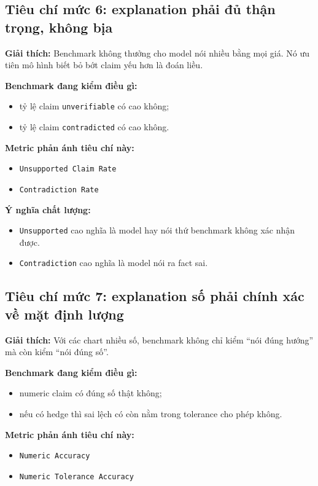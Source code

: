\documentclass[11pt,a4paper]{article}
\newcommand{\field}[1]{\texttt{#1}}
\begin{document}
\subsection{Tiêu chí mức 6: explanation phải đủ thận trọng, không bịa}
\textbf{Giải thích:}
Benchmark không thưởng cho model nói nhiều bằng mọi giá.
Nó ưu tiên mô hình biết bỏ bớt claim yếu hơn là đoán liều.

\textbf{Benchmark đang kiểm điều gì:}
\begin{itemize}
  \item tỷ lệ claim \field{unverifiable} có cao không;
  \item tỷ lệ claim \field{contradicted} có cao không.
\end{itemize}

\textbf{Metric phản ánh tiêu chí này:}
\begin{itemize}
  \item \field{Unsupported Claim Rate}
  \item \field{Contradiction Rate}
\end{itemize}

\textbf{Ý nghĩa chất lượng:}
\begin{itemize}
  \item \field{Unsupported} cao nghĩa là model hay nói thứ benchmark không xác nhận được.
  \item \field{Contradiction} cao nghĩa là model nói ra fact sai.
\end{itemize}

\subsection{Tiêu chí mức 7: explanation số phải chính xác về mặt định lượng}
\textbf{Giải thích:}
Với các chart nhiều số, benchmark không chỉ kiểm ``nói đúng hướng'' mà còn kiểm ``nói đúng số''.

\textbf{Benchmark đang kiểm điều gì:}
\begin{itemize}
  \item numeric claim có đúng số thật không;
  \item nếu có hedge thì sai lệch có còn nằm trong tolerance cho phép không.
\end{itemize}

\textbf{Metric phản ánh tiêu chí này:}
\begin{itemize}
  \item \field{Numeric Accuracy}
  \item \field{Numeric Tolerance Accuracy}
\end{itemize}
\end{document}
